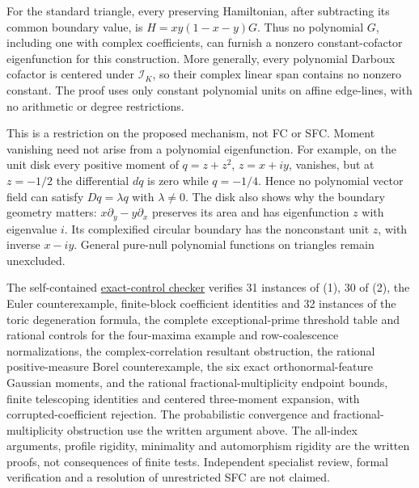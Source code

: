 \documentclass[11pt]{article}
\begin{document}
For the standard triangle, every preserving Hamiltonian, after subtracting
its common boundary value, is $H=xy(1-x-y)G$. Thus no polynomial $G$,
including one with complex coefficients, can furnish a nonzero
constant-cofactor eigenfunction for this construction. More generally, every polynomial Darboux cofactor is centered under
$\mathcal I_K$, so their complex linear span contains no nonzero
constant. The proof uses only constant polynomial units on affine
edge-lines, with no arithmetic or degree restrictions.

This is a restriction on the proposed mechanism, not FC or SFC.
Moment vanishing need not arise from a polynomial eigenfunction.
For example, on the unit disk every positive moment of
$q=z+z^2$, $z=x+iy$, vanishes, but at $z=-1/2$ the differential $dq$
is zero while $q=-1/4$. Hence no polynomial vector field can satisfy
$Dq=\lambda q$ with $\lambda\ne0$. The disk also shows why the
boundary geometry matters: $x\partial_y-y\partial_x$ preserves its
area and has eigenfunction $z$ with eigenvalue $i$. Its complexified
circular boundary has the nonconstant unit $z$, with inverse $x-iy$.
General pure-null polynomial functions on triangles remain unexcluded.

The self-contained
\href{verify_unrestricted_sfc_mechanisms.py}{exact-control checker}
verifies 31 instances of (1), 30 of (2), the Euler counterexample,
finite-block coefficient identities and 32 instances of the toric
degeneration formula, the complete exceptional-prime threshold table
and rational controls for the four-maxima example and row-coalescence
normalizations, the complex-correlation resultant obstruction,
the rational positive-measure Borel counterexample,
the six exact orthonormal-feature Gaussian moments, and the rational
fractional-multiplicity endpoint bounds, finite telescoping identities
and centered three-moment expansion, with corrupted-coefficient rejection.
The probabilistic convergence and fractional-multiplicity obstruction
use the written argument above. The all-index arguments, profile rigidity, minimality and automorphism
rigidity are the written proofs, not consequences of finite tests. Independent specialist
review, formal verification and a resolution of unrestricted SFC are not
claimed.
\end{document}
